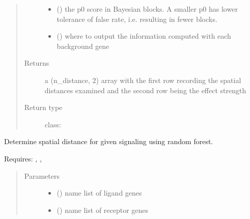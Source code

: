 \documentclass[letterpaper,10pt,english]{sphinxmanual}
\begin{document}
\begin{fulllineitems}
\begin{fulllineitems}
\begin{quote}
\begin{description}
\begin{itemize}
\item {} 
 (\sphinxstyleliteralemphasis{, }) \textendash{} the p0 score in Bayesian blocks. A smaller p0 has lower tolerance of false rate, i.e. resulting in fewer blocks.

\item {} 
 (\sphinxstyleliteralemphasis{, }) \textendash{} where to output the information computed with each background gene

\end{itemize}

\item[{Returns}] \leavevmode
a (n\_distance, 2) array with the first row recording the spatial distances examined and the second row being the effect strength

\item[{Return type}] \leavevmode
class:

\end{description}\end{quote}

\end{fulllineitems}


\begin{fulllineitems}
\label{\detokenize{api:spaotsc.SpaOTsc.spatial_sc.infer_signal_range_ml}}
Determine spatial distance for given signaling using random forest.

Requires: , , 
\begin{quote}\begin{description}
\item[{Parameters}] \leavevmode\begin{itemize}
\item {} 
 () \textendash{} name list of ligand genes

\item {} 
 () \textendash{} name list of receptor genes


\end{itemize}
\end{description}
\end{quote}
\end{fulllineitems}
\end{fulllineitems}
\end{document}
